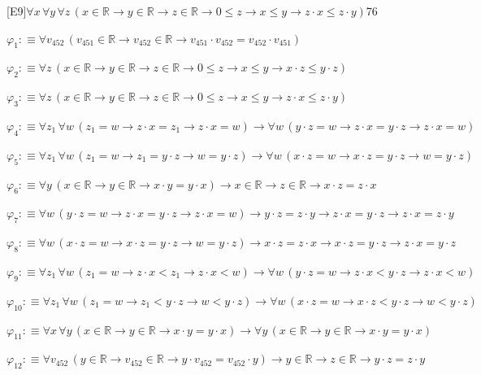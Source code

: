 \begin{fullproof}{[E9]}{$\forall x\,\forall y\,\forall z\,(x \in \mathbb{R} \to y \in \mathbb{R} \to z \in \mathbb{R} \to 0 \leq z \to x \leq y \to z \cdot x \leq z \cdot y)$}{76}
\begin{ptree}
\end{ptree}
\begin{abbrevlist}
\item $\varphi_{1} :\equiv \forall v_{452}\,(v_{451} \in \mathbb{R} \to v_{452} \in \mathbb{R} \to v_{451} \cdot v_{452} = v_{452} \cdot v_{451})$
\item $\varphi_{2} :\equiv \forall z\,(x \in \mathbb{R} \to y \in \mathbb{R} \to z \in \mathbb{R} \to 0 \leq z \to x \leq y \to x \cdot z \leq y \cdot z)$
\item $\varphi_{3} :\equiv \forall z\,(x \in \mathbb{R} \to y \in \mathbb{R} \to z \in \mathbb{R} \to 0 \leq z \to x \leq y \to z \cdot x \leq z \cdot y)$
\item $\varphi_{4} :\equiv \forall z_{1}\,\forall w\,(z_{1} = w \to z \cdot x = z_{1} \to z \cdot x = w) \to \forall w\,(y \cdot z = w \to z \cdot x = y \cdot z \to z \cdot x = w)$
\item $\varphi_{5} :\equiv \forall z_{1}\,\forall w\,(z_{1} = w \to z_{1} = y \cdot z \to w = y \cdot z) \to \forall w\,(x \cdot z = w \to x \cdot z = y \cdot z \to w = y \cdot z)$
\item $\varphi_{6} :\equiv \forall y\,(x \in \mathbb{R} \to y \in \mathbb{R} \to x \cdot y = y \cdot x) \to x \in \mathbb{R} \to z \in \mathbb{R} \to x \cdot z = z \cdot x$
\item $\varphi_{7} :\equiv \forall w\,(y \cdot z = w \to z \cdot x = y \cdot z \to z \cdot x = w) \to y \cdot z = z \cdot y \to z \cdot x = y \cdot z \to z \cdot x = z \cdot y$
\item $\varphi_{8} :\equiv \forall w\,(x \cdot z = w \to x \cdot z = y \cdot z \to w = y \cdot z) \to x \cdot z = z \cdot x \to x \cdot z = y \cdot z \to z \cdot x = y \cdot z$
\item $\varphi_{9} :\equiv \forall z_{1}\,\forall w\,(z_{1} = w \to z \cdot x < z_{1} \to z \cdot x < w) \to \forall w\,(y \cdot z = w \to z \cdot x < y \cdot z \to z \cdot x < w)$
\item $\varphi_{10} :\equiv \forall z_{1}\,\forall w\,(z_{1} = w \to z_{1} < y \cdot z \to w < y \cdot z) \to \forall w\,(x \cdot z = w \to x \cdot z < y \cdot z \to w < y \cdot z)$
\item $\varphi_{11} :\equiv \forall x\,\forall y\,(x \in \mathbb{R} \to y \in \mathbb{R} \to x \cdot y = y \cdot x) \to \forall y\,(x \in \mathbb{R} \to y \in \mathbb{R} \to x \cdot y = y \cdot x)$
\item $\varphi_{12} :\equiv \forall v_{452}\,(y \in \mathbb{R} \to v_{452} \in \mathbb{R} \to y \cdot v_{452} = v_{452} \cdot y) \to y \in \mathbb{R} \to z \in \mathbb{R} \to y \cdot z = z \cdot y$

\end{abbrevlist}
\end{fullproof}
